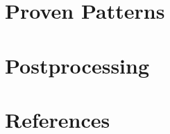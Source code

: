\documentclass[12pt,a4paper]{report}
\begin{document}
\chapter{Proven Patterns}
\label{chap:patterns}


\chapter{Postprocessing}
\label{chap:postprocessing}


\chapter{References}
\label{chap:references}


% 
\end{document}
